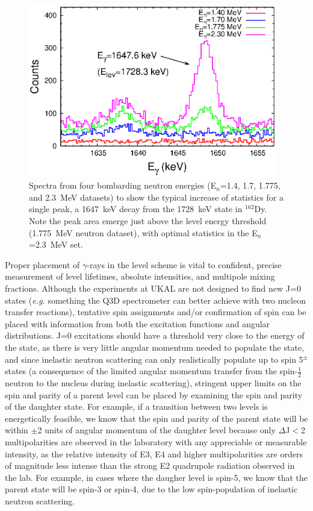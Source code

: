 \begin{figure}[h!]
\begin{center}
\includegraphics[width=0.97\textwidth]{figures/ExF_difference_140_230.eps}
\caption{Spectra from four bombarding neutron energies (E$_n$=1.4, 1.7, 1.775, and 2.3~MeV datasets) to show the typical increase of statistics for a single peak, a 1647~keV decay from the 1728~keV state in $^{162}$Dy. Note the peak area emerge just above the level energy threshold (1.775~MeV neutron dataset), with optimal statistics in the E$_n$=2.3~MeV set.
\label{fig:ExF_difference_140_230}}
\end{center}
\end{figure}

Proper placement of $\gamma$-rays in the level scheme is vital to confident, precise measurement of level lifetimes, absolute intensities, and multipole mixing fractions. Although the experiments at UKAL are not designed to find new J=0 states (\textit{e.g.} something the Q3D spectrometer can better achieve with two nucleon transfer reactions), tentative spin assignments and/or confirmation of spin can be placed with information from both the excitation functions and angular distributions. J=0 excitations should have a threshold very close to the energy of the state, as there is very little angular momentum needed to populate the state, and since inelastic neutron scattering can only realistically populate up to spin 5$^\pm$ states (a consequence of the limited angular momentum transfer from the spin-$\frac{1}{2}$ neutron to the nucleus during inelastic scattering), stringent upper limits on the spin and parity of a parent level can be placed by examining the spin and parity of the daughter state. For example, if a transition between two levels is energetically feasible, we know that the spin and parity of the parent state will be within $\pm$2 units of angular momentum of the daughter level because only $\Delta$J$<$2 multipolarities are observed in the laboratory with any appreciable or measurable intensity, as the relative intensity of E3, E4 and higher multipolarities are orders of magnitude less intense than the strong E2 quadrupole radiation observed in the lab.  For example, in cases where the daugher level is spin-5, we know that the parent state will be spin-3 or spin-4, due to the low spin-population of inelastic neutron scattering. 

